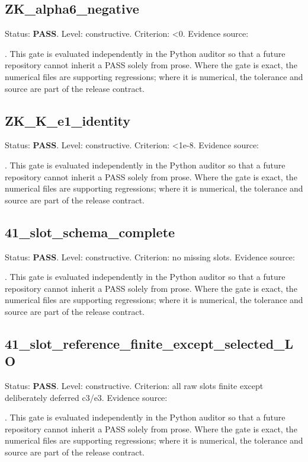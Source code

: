 \documentclass[11pt,a4paper,oneside]{book}
\begin{document}
\subsection{ZK\_alpha6\_negative}
Status: \textbf{PASS}. Level: constructive. Criterion: <0. Evidence source:\par\noindent{}. This gate is evaluated independently in the Python auditor so that a future repository cannot inherit a PASS solely from prose. Where the gate is exact, the numerical files are supporting regressions; where it is numerical, the tolerance and source are part of the release contract.\par

\subsection{ZK\_K\_e1\_identity}
Status: \textbf{PASS}. Level: constructive. Criterion: <1e-8. Evidence source:\par\noindent{}. This gate is evaluated independently in the Python auditor so that a future repository cannot inherit a PASS solely from prose. Where the gate is exact, the numerical files are supporting regressions; where it is numerical, the tolerance and source are part of the release contract.\par

\subsection{41\_slot\_schema\_complete}
Status: \textbf{PASS}. Level: constructive. Criterion: no missing slots. Evidence source:\par\noindent{}. This gate is evaluated independently in the Python auditor so that a future repository cannot inherit a PASS solely from prose. Where the gate is exact, the numerical files are supporting regressions; where it is numerical, the tolerance and source are part of the release contract.\par

\subsection{41\_slot\_reference\_finite\_except\_selected\_LO}
Status: \textbf{PASS}. Level: constructive. Criterion: all raw slots finite except deliberately deferred c3/e3. Evidence source:\par\noindent{}. This gate is evaluated independently in the Python auditor so that a future repository cannot inherit a PASS solely from prose. Where the gate is exact, the numerical files are supporting regressions; where it is numerical, the tolerance and source are part of the release contract.\par
\end{document}
